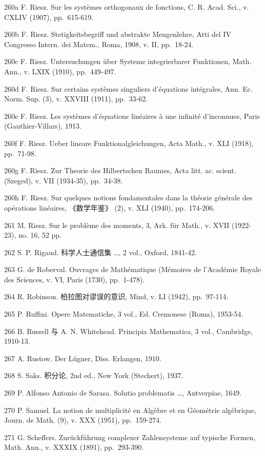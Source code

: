 260a F. Riesz. Sur les systèmes orthogonaux de fonctions, C. R. Acad. Sci., v. CXLIV (1907), pp.~615-619.

260b F. Riesz. Stetigkeitsbegriff und abstrakte Mengenlehre, Atti del IV Congresso Intern. dei Matem., Roma, 1908, v. II, pp.~18-24.

260c F. Riesz. Untersuchungen über Systeme integrierbarer Funktionen, Math. Ann., v. LXIX (1910), pp.~449-497.

260d F. Riesz. Sur certains systèmes singuliers d'équations intégrales, Ann. Ec. Norm. Sup. (3), v. XXVIII (1911), pp.~33-62.

260e F. Riesz. Les systèmes d'équations linéaires à une infinité d'inconnues, Paris (Gauthier-Villars), 1913.

260f F. Riesz. Ueber lineare Funktionalgleichungen, Acta Math., v. XLI (1918), pp.~71-98.

260g F. Riesz. Zur Theorie des Hilbertschen Raumes, Acta litt. ac. scient. (Szeged), v. VII (1934-35), pp.~34-38.

260h F. Riesz. Sur quelques notions fondamentales dans la théorie générale des opérations linéaires, 《数学年鉴》 (2), v. XLI (1940), pp.~174-206.

261 M. Riesz. Sur le problème des moments, 3, Ark. für Math., v. XVII (1922-23), no. 16, 52 pp.

262 S. P. Rigaud. 科学人士通信集 \ldots, 2 vol., Oxford, 1841-42.

263 G. de Roberval. Ouvrages de Mathématique (Mémoires de l'Académie Royale des Sciences, v. VI, Paris (1730), pp.~1-478).

264 R. Robinson. 柏拉图对谬误的意识, Mind, v. LI (1942), pp.~97-114.

265 P. Ruffini. Opere Matematiche, 3 vol., Ed. Cremonese (Roma), 1953-54.

266 B. Russell 与 A. N. Whitehead. Principia Mathematica, 3 vol., Cambridge, 1910-13.

267 A. Rustow. Der Lügner, Diss. Erlangen, 1910.

268 S. Saks. 积分论, 2nd ed., New York (Stechert), 1937.

269 P. Alfonso Antonio de Sarasa. Solutio problematis \ldots, Antverpiae, 1649.

270 P. Samuel. La notion de multiplicité en Algèbre et en Géométrie algébrique, Journ. de Math. (9), v. XXX (1951), pp.~159-274.

271 G. Scheffers. Zurückführung complexer Zahlensysteme auf typische Formen, Math. Ann., v. XXXIX (1891), pp.~293-390.

